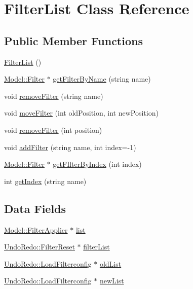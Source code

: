 \hypertarget{classModel_1_1FilterList}{}\section{Filter\+List Class Reference}
\label{classModel_1_1FilterList}
\subsection*{Public Member Functions}
\begin{DoxyCompactItemize}
\item 
\hyperlink{classModel_1_1FilterList_a01ca9d807b9f410ea40bd70743337638}{Filter\+List} ()
\item 
\hyperlink{classModel_1_1Filter}{Model\+::\+Filter} $\ast$ \hyperlink{classModel_1_1FilterList_af5c4c134636ff39a8b4f0f0a6a443178}{get\+Filter\+By\+Name} (string name)
\item 
void \hyperlink{classModel_1_1FilterList_acfe5b66a730352a58df782209557ba82}{remove\+Filter} (string name)
\item 
void \hyperlink{classModel_1_1FilterList_a13c4ca4bd21b65ab2e2f01556338d095}{move\+Filter} (int old\+Position, int new\+Position)
\item 
void \hyperlink{classModel_1_1FilterList_a3cd55a8f60d5021235199170937644c5}{remove\+Filter} (int position)
\item 
void \hyperlink{classModel_1_1FilterList_a0977e76495c1328c469f31dac97ef60d}{add\+Filter} (string name, int index=-\/1)
\item 
\hyperlink{classModel_1_1Filter}{Model\+::\+Filter} $\ast$ \hyperlink{classModel_1_1FilterList_a3c39f1ba92d92107a4e389660746c658}{get\+F\+Ilter\+By\+Index} (int index)
\item 
int \hyperlink{classModel_1_1FilterList_afe5620a51c1e0946f79d6c2a4f7ac340}{get\+Index} (string name)
\end{DoxyCompactItemize}
\subsection*{Data Fields}
\begin{DoxyCompactItemize}
\item 
\hyperlink{classModel_1_1FilterApplier}{Model\+::\+Filter\+Applier} $\ast$ \hyperlink{classModel_1_1FilterList_a9112d56886987751ee0f00bedfb0d571}{list}
\item 
\hyperlink{classUndoRedo_1_1FilterReset}{Undo\+Redo\+::\+Filter\+Reset} $\ast$ \hyperlink{classModel_1_1FilterList_a96269287dfd54a6d36242ba5fe3b7da1}{filter\+List}
\item 
\hyperlink{classUndoRedo_1_1LoadFilterconfig}{Undo\+Redo\+::\+Load\+Filterconfig} $\ast$ \hyperlink{classModel_1_1FilterList_ab9b8c3631972f39309b9810f2b58b094}{old\+List}
\item 
\hyperlink{classUndoRedo_1_1LoadFilterconfig}{Undo\+Redo\+::\+Load\+Filterconfig} $\ast$ \hyperlink{classModel_1_1FilterList_a835cb4539ec6d9b4021efc25db09e1ea}{new\+List}
\end{DoxyCompactItemize}

